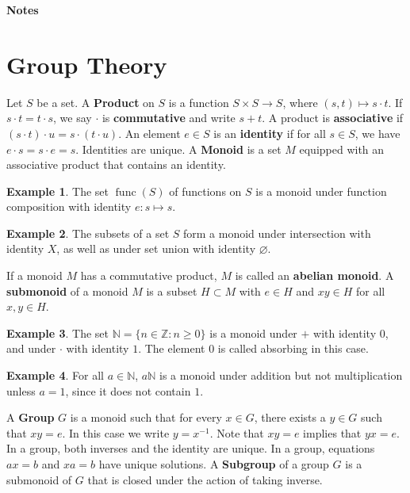 \documentclass[12pt, reqno]{article}
\theoremstyle{plain}
\theoremstyle{definition}
\newtheorem*{example}{Example}
\theoremstyle{remark}
\renewcommand{\emptyset}{\varnothing}
\begin{document}
\topmargin=-40pt
\renewcommand{\headrulewidth}{1pt}
\renewcommand{\headsep}{20pt}
\thispagestyle{fancy}

{\Huge \bfseries {} Notes}

\section*{Group Theory}

Let $S$ be a set. A \textbf{Product} on $S$ is a function $S\times S \rightarrow S$,
where $(s,t) \mapsto s\cdot t$. 
If $s\cdot t = t \cdot s$, we say $\cdot$ is \textbf{commutative} and write $s + t$. 
A product is \textbf{associative} if $(s\cdot t)\cdot u = s \cdot (t \cdot u)$.
An element $e \in S$ is an \textbf{identity} if for all $s \in S$, we have $e\cdot s = s \cdot e = s$.
Identities are unique. 
A \textbf{Monoid} is a set $M$ equipped with an associative product that contains an identity.
\begin{example} 
    The set $\operatorname{func}(S)$ of functions on $S$ is a monoid under function 
    composition with identity $e: s \mapsto s$.
\end{example}

\begin{example}
    The subsets of a set $S$ form a monoid under intersection with identity $X$,
    as well as under set union with identity $\emptyset$.
\end{example}

If a monoid $M$ has a commutative product, $M$ is called an \textbf{abelian monoid}. A \textbf{submonoid} of a
monoid $M$ is a subset $H \subset M$ with $e \in H$ and $xy \in H$ for all $x, y \in H$. 

\begin{example}
    The set $\mathbb{N} = \{n \in \mathbb{Z}: n \geq 0\}$ is a monoid under $+$ with identity $0$, and under 
    $\cdot$ with identity $1$. The element $0$ is called absorbing in this case.
\end{example}

\begin{example}
    For all $a \in \mathbb{N}$, $a\mathbb{N}$ is a monoid under addition but not multiplication unless $a = 1$, 
    since it does not contain $1$. 
\end{example}

A \textbf{Group} $G$ is a monoid such that for every $x \in G$, there exists a $y \in G$ such that $xy = e$. In this case
we write $y = x^{-1}$. Note that $xy = e$ implies that $yx = e$. In a group, both inverses and the identity are unique.
In a group, equations $ax = b$ and $xa = b$ have unique solutions. A \textbf{Subgroup} of a group $G$ is a submonoid
of $G$ that is closed under the action of taking inverse.
\end{document}
